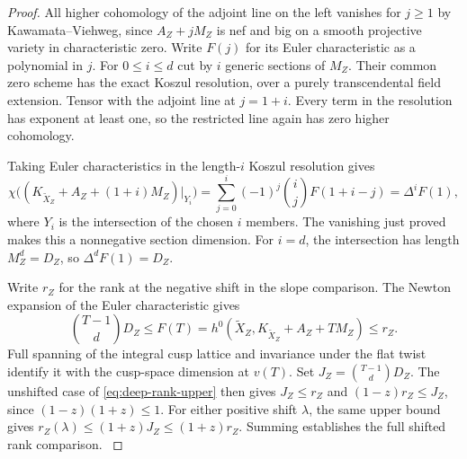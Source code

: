 \begin{proof}
All higher cohomology of the adjoint line on the left
vanishes for \(j\ge1\) by Kawamata--Viehweg, since
\(A_Z+jM_Z\) is nef and big on a smooth projective
variety in characteristic zero. Write \(F(j)\) for
its Euler characteristic as a polynomial in \(j\).
For \(0\le i\le d\) cut by \(i\) generic sections of
\(M_Z\). Their common zero scheme has the exact Koszul
resolution, over a purely transcendental field extension.
Tensor with the adjoint line at \(j=1+i\). Every term in
the resolution has exponent at least one, so the
restricted line again has zero higher cohomology.

Taking Euler characteristics in the length-\(i\) Koszul
resolution gives
\[
  \chi\bigl((K_{\widetilde X_Z}+A_Z+(1+i)M_Z)|_{Y_i}\bigr)
   =\sum_{j=0}^{i}(-1)^j\binom ij F(1+i-j)=\Delta^i F(1),
\]
where \(Y_i\) is the intersection of the chosen \(i\)
members. The vanishing just proved makes this a nonnegative
section dimension. For \(i=d\), the intersection has
length \(M_Z^d=D_Z\), so \(\Delta^d F(1)=D_Z\).

Write \(r_Z\) for the rank at the negative shift in the
slope comparison.
The
Newton expansion of the Euler characteristic gives
\[
  \binom{T-1}{d}D_Z
  \le F(T)
  = h^0(\widetilde X_Z,K_{\widetilde X_Z}+A_Z+TM_Z)
  \le r_Z .
\]
Full spanning of the integral cusp lattice
and invariance under the flat twist identify it with the
cusp-space dimension at \(v(T)\). Set \(J_Z=\binom{T-1}{d}D_Z\).
The unshifted case of \eqref{eq:deep-rank-upper} then
gives \(J_Z\le r_Z\) and \((1-z)r_Z\le J_Z\), since
\((1-z)(1+z)\le1\).
For either positive shift \(\lambda\), the same upper
bound gives \(r_Z(\lambda)\le(1+z)J_Z\le(1+z)r_Z\).
Summing establishes the full shifted rank comparison.
\label{cor:covolume-component-ranks-4}
\end{proof}
